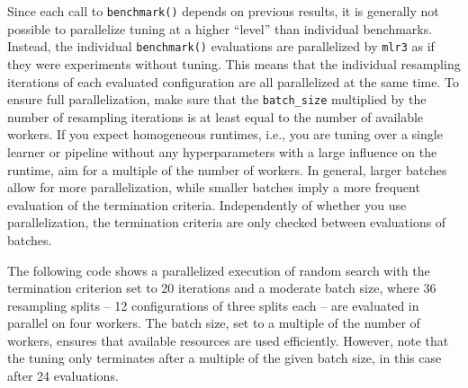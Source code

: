 Since each call to \texttt{benchmark()} depends on previous results, it
is generally not possible to parallelize tuning at a higher ``level''
than individual benchmarks. Instead, the individual \texttt{benchmark()}
evaluations are parallelized by \texttt{mlr3} as if they were
experiments without tuning. This means that the individual resampling
iterations of each evaluated configuration are all parallelized at the
same time. To ensure full parallelization, make sure that the
\texttt{batch\_size} multiplied by the number of resampling iterations
is at least equal to the number of available workers. If you expect
homogeneous runtimes, i.e., you are tuning over a single learner or
pipeline without any hyperparameters with a large influence on the
runtime, aim for a multiple of the number of workers. In general, larger
batches allow for more parallelization, while smaller batches imply a
more frequent evaluation of the termination criteria. Independently of
whether you use parallelization, the termination criteria are only
checked between evaluations of batches.

The following code shows a parallelized execution of random search with
the termination criterion set to 20 iterations and a moderate batch
size, where 36 resampling splits -- 12 configurations of three splits
each -- are evaluated in parallel on four workers. The batch size, set
to a multiple of the number of workers, ensures that available resources
are used efficiently. However, note that the tuning only terminates
after a multiple of the given batch size, in this case after 24
evaluations.

\begin{Shaded}
\begin{Highlighting}[]
\SpecialCharTok{::}\NormalTok{(}\NormalTok{, } \NormalTok{)}

\OtherTok{=} \NormalTok{(}
  \NormalTok{(}\NormalTok{, } \NormalTok{),}
  \NormalTok{(}\NormalTok{),}
  \NormalTok{(}\NormalTok{, } \NormalTok{(}\NormalTok{, }\NormalTok{)),}
  \NormalTok{(}\NormalTok{, } \NormalTok{),}
   
\NormalTok{)}

\SpecialCharTok{$}\SpecialCharTok{$}
\end{Highlighting}
\end{Shaded}

